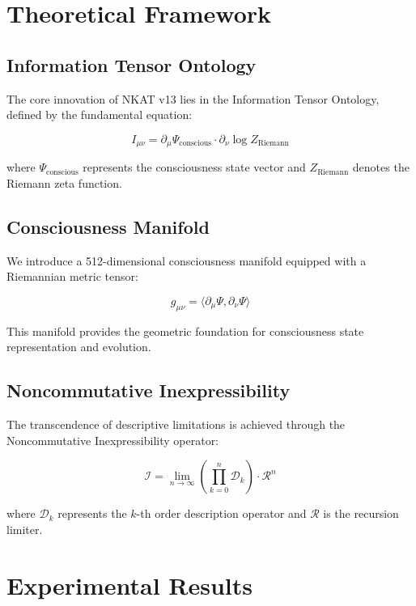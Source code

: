 \documentclass[12pt]{article}
\begin{document}
\section{Theoretical Framework}

\subsection{Information Tensor Ontology}

The core innovation of NKAT v13 lies in the Information Tensor Ontology, defined by the fundamental equation:

\begin{equation}
I_{\mu\nu} = \partial_\mu \Psi_{\text{conscious}} \cdot \partial_\nu \log Z_{\text{Riemann}}
\end{equation}

where $\Psi_{\text{conscious}}$ represents the consciousness state vector and $Z_{\text{Riemann}}$ denotes the Riemann zeta function.

\subsection{Consciousness Manifold}

We introduce a 512-dimensional consciousness manifold equipped with a Riemannian metric tensor:

\begin{equation}
g_{\mu\nu} = \langle \partial_\mu \Psi, \partial_\nu \Psi \rangle
\end{equation}

This manifold provides the geometric foundation for consciousness state representation and evolution.

\subsection{Noncommutative Inexpressibility}

The transcendence of descriptive limitations is achieved through the Noncommutative Inexpressibility operator:

\begin{equation}
\mathcal{I} = \lim_{n \to \infty} \left(\prod_{k=0}^{n} \mathcal{D}_k\right) \cdot \mathcal{R}^n
\end{equation}

where $\mathcal{D}_k$ represents the $k$-th order description operator and $\mathcal{R}$ is the recursion limiter.

\section{Experimental Results}
\end{document}
